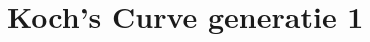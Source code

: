 \documentclass{../qh_assignment}
\begin{document}
\section{Koch's Curve generatie 1}
\end{document}
